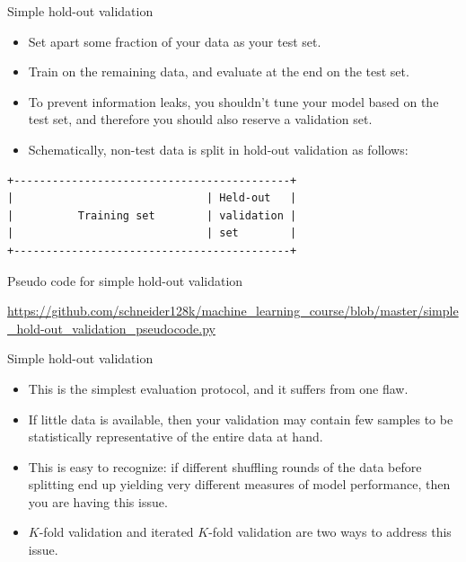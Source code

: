 \documentclass{beamer}
\begin{document}

\begin{frame}[fragile]{Simple hold-out validation}
\begin{itemize}
\item Set apart some fraction of your data as your test set.

\medskip
\item Train on the remaining data, and evaluate at the end on the test set.

\medskip
\item To prevent information leaks, you shouldn't tune your model based on the test set, and therefore you should also reserve a validation set.

\medskip
\item Schematically, non-test data is split in hold-out validation as follows:
\end{itemize}

\medskip
\begin{verbatim}
+-------------------------------------------+
|                              | Held-out   |
|          Training set        | validation |
|                              | set        |
+-------------------------------------------+
\end{verbatim}
\end{frame}


\begin{frame}[fragile]{Pseudo code for simple hold-out validation}

{\small
\url{https://github.com/schneider128k/machine\_learning\_course/blob/master/simple\_hold-out\_validation\_pseudocode.py}
}
\end{frame}


\begin{frame}{Simple hold-out validation}
\begin{itemize}
\item This is the simplest evaluation protocol, and it suffers from one flaw.

\medskip
\item If little data is available, then your validation may contain few samples to be statistically representative of the entire data at hand.

\medskip
\item This is easy to recognize: if different shuffling rounds of the data before splitting end up yielding very different measures of model performance, then you are having this issue.

\medskip
\item $K$-fold validation and iterated $K$-fold validation are two ways to address this issue.
\end{itemize}
\end{frame}
\end{document}
